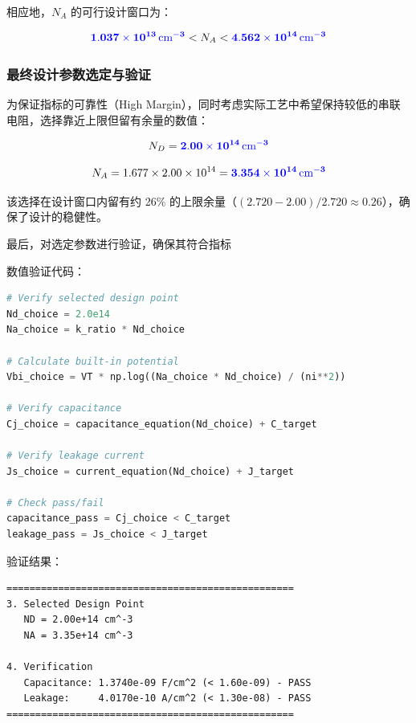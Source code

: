 \documentclass[12pt,a4paper]{article}
\begin{document}
相应地，$N_A$ 的可行设计窗口为：

\begin{equation}
\textcolor{blue}{\mathbf{1.037 \times 10^{13}\,\text{cm}^{-3}}} < N_A < \textcolor{blue}{\mathbf{4.562 \times 10^{14}\,\text{cm}^{-3}}}
\end{equation}

\clearpage
\subsubsection{最终设计参数选定与验证}

为保证指标的可靠性（High Margin），同时考虑实际工艺中希望保持较低的串联电阻，选择靠近上限但留有余量的数值：

\begin{equation}
N_D = \textcolor{blue}{\mathbf{2.00 \times 10^{14}\,\text{cm}^{-3}}}
\end{equation}

\begin{equation}
N_A = 1.677 \times 2.00 \times 10^{14} = \textcolor{blue}{\mathbf{3.354 \times 10^{14}\,\text{cm}^{-3}}}
\end{equation}

该选择在设计窗口内留有约 26\% 的上限余量（$(2.720 - 2.00)/2.720 \approx 0.26$），确保了设计的稳健性。

最后，对选定参数进行验证，确保其符合指标

\vspace{1em}
{\heiti 数值验证代码：}

\begin{lstlisting}[language=Python, caption={PN结参数数值求解程序（第二部分：设计验证）}]
# Verify selected design point
Nd_choice = 2.0e14
Na_choice = k_ratio * Nd_choice

# Calculate built-in potential
Vbi_choice = VT * np.log((Na_choice * Nd_choice) / (ni**2))

# Verify capacitance
Cj_choice = capacitance_equation(Nd_choice) + C_target

# Verify leakage current
Js_choice = current_equation(Nd_choice) + J_target

# Check pass/fail
capacitance_pass = Cj_choice < C_target
leakage_pass = Js_choice < J_target
\end{lstlisting}

\vspace{1em}

\clearpage
{\heiti 验证结果：}

\begin{lstlisting}[caption={设计参数验证结果}]
==================================================
3. Selected Design Point
   ND = 2.00e+14 cm^-3
   NA = 3.35e+14 cm^-3

4. Verification
   Capacitance: 1.3740e-09 F/cm^2 (< 1.60e-09) - PASS
   Leakage:     4.0170e-10 A/cm^2 (< 1.30e-08) - PASS
==================================================
\end{lstlisting}
\end{document}
